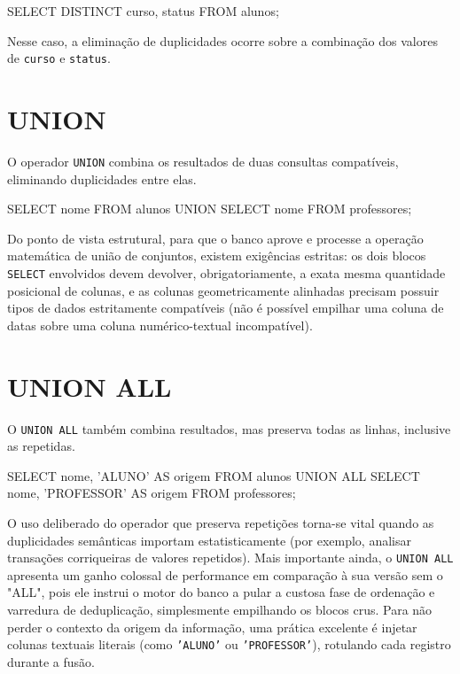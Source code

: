 \begin{sqlcode}
SELECT DISTINCT curso, status
FROM alunos;
\end{sqlcode}

Nesse caso, a eliminação de duplicidades ocorre sobre a combinação dos valores de \texttt{curso} e \texttt{status}.

\section{UNION}

O operador \texttt{UNION} combina os resultados de duas consultas compatíveis, eliminando duplicidades entre elas.

\begin{sqlcode}
SELECT nome
FROM alunos
UNION
SELECT nome
FROM professores;
\end{sqlcode}

Do ponto de vista estrutural, para que o banco aprove e processe a operação matemática de união de conjuntos, existem exigências estritas: os dois blocos \texttt{SELECT} envolvidos devem devolver, obrigatoriamente, a exata mesma quantidade posicional de colunas, e as colunas geometricamente alinhadas precisam possuir tipos de dados estritamente compatíveis (não é possível empilhar uma coluna de datas sobre uma coluna numérico-textual incompatível).

\section{UNION ALL}

O \texttt{UNION ALL} também combina resultados, mas preserva todas as linhas, inclusive as repetidas.

\begin{sqlcode}
SELECT nome, 'ALUNO' AS origem
FROM alunos
UNION ALL
SELECT nome, 'PROFESSOR' AS origem
FROM professores;
\end{sqlcode}

O uso deliberado do operador que preserva repetições torna-se vital quando as duplicidades semânticas importam estatisticamente (por exemplo, analisar transações corriqueiras de valores repetidos). Mais importante ainda, o \texttt{UNION ALL} apresenta um ganho colossal de performance em comparação à sua versão sem o "ALL", pois ele instrui o motor do banco a pular a custosa fase de ordenação e varredura de deduplicação, simplesmente empilhando os blocos crus. Para não perder o contexto da origem da informação, uma prática excelente é injetar colunas textuais literais (como \texttt{'ALUNO'} ou \texttt{'PROFESSOR'}), rotulando cada registro durante a fusão.

